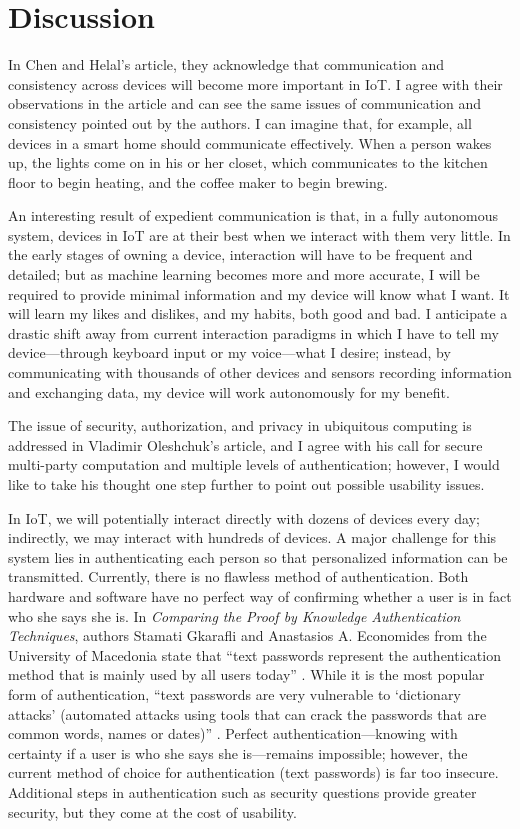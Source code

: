 \documentclass[11pt, oneside]{article}   	%
\begin{document}
\section{Discussion}
In Chen and Helal's article, they acknowledge that communication and consistency across devices will become more important in IoT. I agree with their observations in the article and can see the same issues of communication and consistency pointed out by the authors. I can imagine that, for example, all devices in a smart home should communicate effectively. When a person wakes up, the lights come on in his or her closet, which communicates to the kitchen floor to begin heating, and the coffee maker to begin brewing.

An interesting result of expedient communication is that, in a fully autonomous system, devices in IoT are at their best when we interact with them very little. In the early stages of owning a device, interaction will have to be frequent and detailed; but as machine learning becomes more and more accurate, I will be required to provide minimal information and my device will know what I want. It will learn my likes and dislikes, and my habits, both good and bad. I anticipate a drastic shift away from current interaction paradigms in which I have to tell my device---through keyboard input or my voice---what I desire; instead, by communicating with thousands of other devices and sensors recording information and exchanging data, my device will work autonomously for my benefit.

The issue of security, authorization, and privacy in ubiquitous computing is addressed in Vladimir Oleshchuk's article, and I agree with his call for secure multi-party computation and multiple levels of authentication; however, I would like to take his thought one step further to point out possible usability issues.

In IoT, we will potentially interact directly with dozens of devices every day; indirectly, we may interact with hundreds of devices. A major challenge for this system lies in authenticating each person so that personalized information can be transmitted. Currently, there is no flawless method of authentication. Both hardware and software have no perfect way of confirming whether a user is in fact who she says she is. In \textit{Comparing the Proof by Knowledge Authentication Techniques}, authors Stamati Gkarafli and Anastasios A. Economides from the University of Macedonia state that ``text passwords represent the authentication method that is mainly used by all users today'' \cite{gkarafli}.  While it is the most popular form of authentication, ``text passwords are very vulnerable to `dictionary attacks' (automated attacks using tools that can crack the passwords that are common words, names or dates)''  \cite{gkarafli}. Perfect authentication---knowing with certainty if a user is who she says she is---remains impossible; however, the current method of choice for authentication (text passwords) is far too insecure. Additional steps in authentication such as security questions provide greater security, but they come at the cost of usability.
\end{document}
